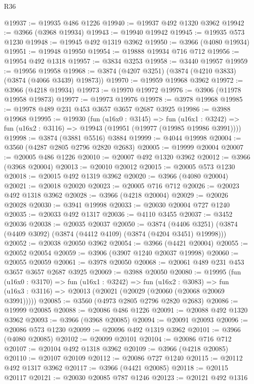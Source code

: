 \begin{lexlean}{R36}
\begin{coremodule}
@19937 := @19935 @486 @1226
@19940 := @19937 @492 @1320 @3962
@19942 := @3966 (@3968 @19934)
@19943 := @19940 @19942
@19945 := @19935 @573 @1230
@19948 := @19945 @492 @1319 @3962
@19950 := @3966 (@4080 @19934)
@19951 := @19948 @19950
@19954 := @19888 @19934 @716 @712
@19956 := @19954 @492 @1318
@19957 := @3834 @3253
@19958 := @3440 @19957
@19959 := @19956 @19958
@19968 := @3874 (@4207 @3251) (@3874 (@4210 @3833) (@3874 (@4066 @3439) @19873))
@19970 := @19959 @19968 @3962
@19972 := @3966 (@4218 @19934)
@19973 := @19970 @19972
@19976 := @3906 (@11978 @19958 @19873)
@19977 := @19973 @19976
@19978 := @3978 @19968
@19985 := @19978 @489 @231 @453 @3657 @3657 @2687 @3925
@19986 := @3988 @19968
@19995 := @19930
    (fun (u16x0 : @3145) =>
    fun (u16x1 : @3242) => fun (u16x2 : @3116) => @19943 (@19951 (@19977 (@19985 @19986 @3991))))
@19998 := @3874 (@3881 @5516) @3884
@19999 := @4044 @19998
@20004 := @3560 (@4287 @2805 @2796 @2820 @2683)
@20005 := @19999 @20004
@20007 := @20005 @486 @1226
@20010 := @20007 @492 @1320 @3962
@20012 := @3966 (@3968 @20004)
@20013 := @20010 @20012
@20015 := @20005 @573 @1230
@20018 := @20015 @492 @1319 @3962
@20020 := @3966 (@4080 @20004)
@20021 := @20018 @20020
@20023 := @20005 @716 @712
@20026 := @20023 @492 @1318 @3962
@20028 := @3966 (@4218 @20004)
@20029 := @20026 @20028
@20030 := @3941 @19998
@20033 := @20030 @20004 @727 @1240
@20035 := @20033 @492 @1317
@20036 := @4110 @3455
@20037 := @3452 @20036
@20038 := @20035 @20037
@20050 := @3874
    (@4406 @3251)
    (@3874 (@4409 @3092) (@3874 (@4412 @4109) (@3874 (@4204 @3451) @19998)))
@20052 := @20038 @20050 @3962
@20054 := @3966 (@4421 @20004)
@20055 := @20052 @20054
@20059 := @3906 (@3907 @1240 @20037 @19998)
@20060 := @20055 @20059
@20061 := @3978 @20050
@20068 := @20061 @489 @231 @453 @3657 @3657 @2687 @3925
@20069 := @3988 @20050
@20080 := @19995
    (fun (u16x0 : @3170) =>
    fun (u16x1 : @3242) =>
    fun (u16x2 : @3083) =>
    fun (u16x3 : @3116) => @20013 (@20021 (@20029 (@20060 (@20068 @20069 @3991)))))
@20085 := @3560 (@4973 @2805 @2796 @2820 @2683)
@20086 := @19999 @20085
@20088 := @20086 @486 @1226
@20091 := @20088 @492 @1320 @3962
@20093 := @3966 (@3968 @20085)
@20094 := @20091 @20093
@20096 := @20086 @573 @1230
@20099 := @20096 @492 @1319 @3962
@20101 := @3966 (@4080 @20085)
@20102 := @20099 @20101
@20104 := @20086 @716 @712
@20107 := @20104 @492 @1318 @3962
@20109 := @3966 (@4218 @20085)
@20110 := @20107 @20109
@20112 := @20086 @727 @1240
@20115 := @20112 @492 @1317 @3962
@20117 := @3966 (@4421 @20085)
@20118 := @20115 @20117
@20121 := @20030 @20085 @787 @1246
@20123 := @20121 @492 @1316

\end{coremodule}
\end{lexlean}
